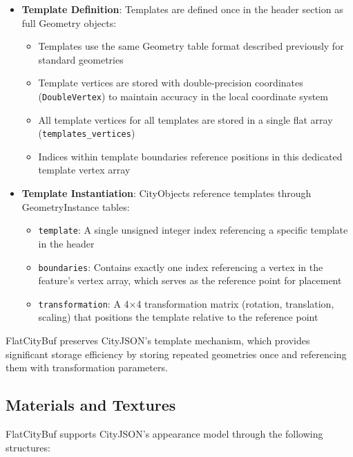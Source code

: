\begin{itemize}
  \item \textbf{Template Definition}: Templates are defined once in the header section as full Geometry objects:
    \begin{itemize}
      \item Templates use the same Geometry table format described previously for standard geometries
      \item Template vertices are stored with double-precision coordinates (\texttt{DoubleVertex}) to maintain accuracy in the local coordinate system
      \item All template vertices for all templates are stored in a single flat array (\texttt{templates\_vertices})
      \item Indices within template boundaries reference positions in this dedicated template vertex array
    \end{itemize}

  \item \textbf{Template Instantiation}: CityObjects reference templates through GeometryInstance tables:
    \begin{itemize}
      \item \texttt{template}: A single unsigned integer index referencing a specific template in the header
      \item \texttt{boundaries}: Contains exactly one index referencing a vertex in the feature's vertex array, which serves as the reference point for placement
      \item \texttt{transformation}: A 4×4 transformation matrix (rotation, translation, scaling) that positions the template relative to the reference point
    \end{itemize}
\end{itemize}

FlatCityBuf preserves CityJSON's template mechanism, which provides significant storage efficiency by storing repeated geometries once and referencing them with transformation parameters.

\subsection{Materials and Textures}
\label{methodology:feature_encoding:materials_textures}

FlatCityBuf supports CityJSON's appearance model through the following structures:

